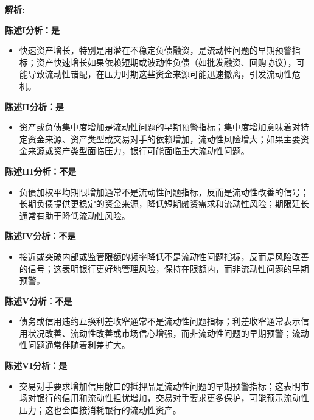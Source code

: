 \documentclass{article}
\newenvironment{explanation}
{\textbf{解析:}\par}
{\par}
\begin{document}
\begin{explanation}
    \textbf{陈述I分析：是}
    \begin{itemize}
        \item 快速资产增长，特别是用潜在不稳定负债融资，是流动性问题的早期预警指标；资产快速增长如果依赖短期或波动性负债（如批发融资、回购协议），可能导致流动性错配，在压力时期这些资金来源可能迅速撤离，引发流动性危机。
    \end{itemize}

    \textbf{陈述II分析：是}
    \begin{itemize}
        \item 资产或负债集中度增加是流动性问题的早期预警指标；集中度增加意味着对特定资金来源、资产类型或交易对手的依赖增加，流动性风险增大；如果主要资金来源或资产类型面临压力，银行可能面临重大流动性问题。
    \end{itemize}

    \textbf{陈述III分析：不是}
    \begin{itemize}
        \item 负债加权平均期限增加通常不是流动性问题指标，反而是流动性改善的信号；长期负债提供更稳定的资金来源，降低短期融资需求和流动性风险；期限延长通常有助于降低流动性风险。
    \end{itemize}

    \textbf{陈述IV分析：不是}
    \begin{itemize}
        \item 接近或突破内部或监管限额的频率降低不是流动性问题指标，反而是风险改善的信号；这表明银行更好地管理风险，保持在限额内，而非流动性问题的早期预警。
    \end{itemize}

    \textbf{陈述V分析：不是}
    \begin{itemize}
        \item 债务或信用违约互换利差收窄通常不是流动性问题指标；利差收窄通常表示信用状况改善、流动性改善或市场信心增强，而非流动性问题的早期预警；流动性问题通常伴随着利差扩大。
    \end{itemize}

    \textbf{陈述VI分析：是}
    \begin{itemize}
        \item 交易对手要求增加信用敞口的抵押品是流动性问题的早期预警指标；这表明市场对银行的信用和流动性担忧增加，交易对手要求更多保护，可能预示流动性压力；这也会直接消耗银行的流动性资产。
    \end{itemize}
\end{explanation}
\end{document}
